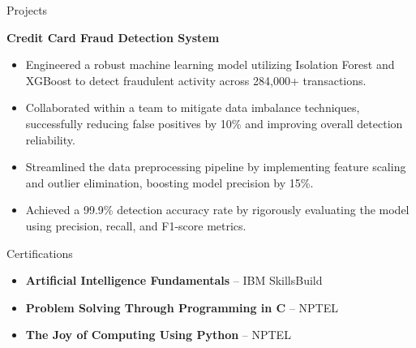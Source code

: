 \documentclass{resume} %
\begin{document}
\begin{rSection}{Projects}

\textbf{Credit Card Fraud Detection System} 
\begin{itemize}
    \item Engineered a robust machine learning model utilizing Isolation Forest and XGBoost to detect fraudulent activity across 284,000+ transactions.
    \item Collaborated within a team to mitigate data imbalance techniques, successfully reducing false positives by 10\% and improving overall detection reliability.
    \item Streamlined the data preprocessing pipeline by implementing feature scaling and outlier elimination, boosting model precision by 15\%.
    \item Achieved a 99.9\% detection accuracy rate by rigorously evaluating the model using precision, recall, and F1-score metrics.
\end{itemize}

\end{rSection}

\begin{rSection}{Certifications}
\begin{itemize}
    \item \textbf{Artificial Intelligence Fundamentals} – IBM SkillsBuild
    \item \textbf{Problem Solving Through Programming in C} – NPTEL
    \item \textbf{The Joy of Computing Using Python} – NPTEL
\end{itemize}
\end{rSection}
\end{document}
